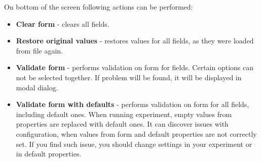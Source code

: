 On bottom of the screen following actions can be performed:
\begin{itemize}
	\item \textbf{Clear form} - clears all fields.
	\item \textbf{Restore original values} - restores values for all fields, as they were loaded from file again.
	\item \textbf{Validate form} - performs validation on form for fields. Certain options can not be selected together. If problem will be found, it will be displayed in modal dialog.
	\item \textbf{Validate form with defaults} - performs validation on form for all fields, including default ones. When running experiment, empty values from properties are replaced with default ones. It can discover issues with configuration, when values from form and default properties are not correctly set. If you find such issue, you should change settings in your experiment or in default properties.
\end{itemize}

